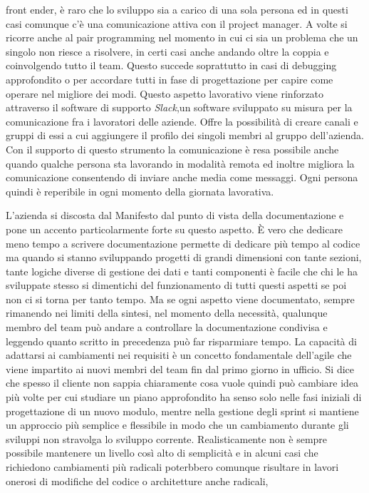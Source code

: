 \documentclass[target=bach,aauheader=,style=]{thud}
\begin{document}
front ender, è raro che lo sviluppo sia a carico di una sola persona ed in questi casi comunque c'è una comunicazione attiva con il project manager.
A volte si ricorre anche al pair programming nel momento in cui ci sia un problema che un singolo non riesce a risolvere, in certi casi anche andando oltre la
coppia e coinvolgendo tutto il team. Questo succede soprattutto in casi di debugging approfondito o per accordare tutti in fase di progettazione per capire
come operare nel migliore dei modi.
Questo aspetto lavorativo viene rinforzato attraverso il software di supporto \textit{Slack}\cite{slack},un software sviluppato su misura per la comunicazione fra
i lavoratori delle aziende. Offre la possibilità di creare canali e gruppi di essi a cui aggiungere il profilo dei singoli membri al gruppo dell'azienda.
Con il supporto di questo strumento la comunicazione è resa possibile anche quando qualche persona sta lavorando in modalità remota ed inoltre migliora la
comunicazione consentendo di inviare anche media come messaggi. Ogni persona quindi è reperibile in ogni momento della giornata lavorativa.
\par L'azienda si discosta dal Manifesto dal punto di vista della documentazione e pone un accento particolarmente forte su questo aspetto.
È vero che dedicare meno tempo a scrivere documentazione permette di dedicare più tempo al codice ma quando si stanno sviluppando progetti di grandi dimensioni
con tante sezioni, tante logiche diverse di gestione dei dati e tanti componenti è facile che chi le ha sviluppate stesso si dimentichi del funzionamento di
tutti questi aspetti se poi non ci si torna per tanto tempo. Ma se ogni aspetto viene documentato, sempre rimanendo nei limiti della sintesi, nel momento della
necessità, qualunque membro del team può andare a controllare la documentazione condivisa e leggendo quanto scritto in precedenza può far risparmiare tempo.
La capacità di adattarsi ai cambiamenti nei requisiti è un concetto fondamentale dell'agile che viene impartito ai nuovi membri del team fin dal primo giorno
in ufficio. Si dice che spesso il cliente non sappia chiaramente cosa vuole quindi può cambiare idea più volte per cui studiare un piano approfondito ha
senso solo nelle fasi iniziali di progettazione di un nuovo modulo, mentre nella gestione degli sprint si mantiene un approccio più semplice e flessibile in modo
che un cambiamento durante gli sviluppi non stravolga lo sviluppo corrente. Realisticamente non è sempre possibile mantenere un livello così alto di semplicità
e in alcuni casi che richiedono cambiamenti più radicali poterbbero comunque risultare in lavori onerosi di modifiche del codice o architetture anche radicali,
\end{document}
